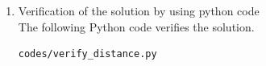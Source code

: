 \begin{enumerate}[label=\thesection.\arabic*.,ref=\thesection.\theenumi]
%
%
%
\item Verification of the solution by using python code	
\\
\solution The  following Python code verifies the solution.
%
\begin{lstlisting}
codes/verify_distance.py
\end{lstlisting}


\end{enumerate}
